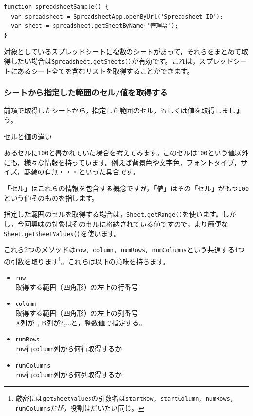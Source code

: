 \documentclass[uplatex,a4j]{jsarticle}
\begin{document}
\begin{lstlisting}[basicstyle=\ttfamily\footnotesize,frame=single,caption=SpreadsheetApp sample 3]
function spreadsheetSample() {
  var spreadsheet = SpreadsheetApp.openByUrl('Spreadsheet ID');
  var sheet = spreadsheet.getSheetByName('管理票');
}
\end{lstlisting}

対象としているスプレッドシートに複数のシートがあって，それらをまとめて取得したい場合は\verb|Spreadsheet.getSheets()|が有効です。これは，スプレッドシートにあるシート全てを含むリストを取得することができます。

\subsubsection{シートから指定した範囲のセル/値を取得する}


前項で取得したシートから，指定した範囲のセル，もしくは値を取得しましょう。

\begin{itembox}[l]{セルと値の違い}

あるセルに\verb|100|と書かれていた場合を考えてみます。このセルは\verb|100|という値以外にも，様々な情報を持っています。例えば背景色や文字色，フォントタイプ，サイズ，罫線の有無・・・といった具合です。


「セル」はこれらの情報を包含する概念ですが，「値」はその「セル」がもつ\verb|100|という値そのものを指します。

\end{itembox}

指定した範囲のセルを取得する場合は，\verb|Sheet.getRange()|を使います。しかし，今回興味の対象はそのセルに格納されている値ですので，より簡便な\verb|Sheet.getSheetValues()|を使います。

これら2つのメソッドは\verb|row, column, numRows, numColumns|という共通する4つの引数を取ります\footnote{厳密には\verb|getSheetValues|の引数名は\verb|startRow, startColumn, numRows, numColumns|だが，役割はだいたい同じ。}。これらは以下の意味を持ちます。

\begin{itemize}
\item \verb|row|\\
取得する範囲（四角形）の左上の行番号
\item \verb|column|\\
取得する範囲（四角形）の左上の列番号\\
A列が1, B列が2,...と，整数値で指定する。
\item \verb|numRows|\\
\verb|row|行\verb|column|列から何行取得するか
\item \verb|numColumns|\\
\verb|row|行\verb|column|列から何列取得するか
\end{itemize}
\end{document}
